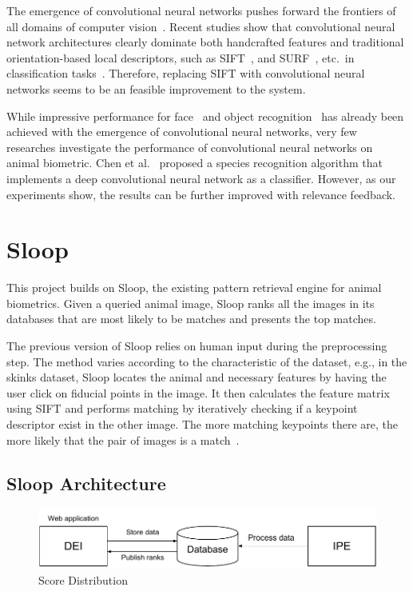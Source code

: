 The emergence of convolutional neural networks pushes forward the frontiers of
all domains of computer vision~\cite{lecun95}. Recent studies show that
convolutional neural network architectures clearly dominate both handcrafted
features and traditional orientation-based local descriptors, such as
SIFT~\cite{lowe04}, and SURF~\cite{surf08}, etc.\ in classification
tasks~\cite{fisher14,kriz12,prelu15,ILSVRC15}. Therefore, replacing SIFT with
convolutional neural networks seems to be an feasible improvement to the system.

While impressive performance for face~\cite{facerec97,deepface14} and object
recognition~\cite{kriz12,ILSVRC15} has already been achieved with the emergence
of convolutional neural networks, very few researches investigate the
performance of convolutional neural networks on animal biometric. Chen et
al.~\cite{animal14} proposed a species recognition algorithm that implements a
deep convolutional neural network as a classifier. However, as our experiments
show, the results can be further improved with relevance feedback.

\section{Sloop} %
\label{sec:sloop}

This project builds on Sloop, the existing pattern retrieval engine for animal
biometrics. Given a queried animal image, Sloop ranks all the images in its
databases that are most likely to be matches and presents the top matches.

The previous version of Sloop relies on human input during the preprocessing
step. The method varies according to the characteristic of the dataset, e.g., in
the skinks dataset, Sloop locates the animal and necessary features by having
the user click on fiducial points in the image. It then calculates the feature
matrix using SIFT and performs matching by iteratively checking if a keypoint
descriptor exist in the other image.  The more matching keypoints there are, the
more likely that the pair of images is a match~\cite{sloop15,sloop14,sloop13}.

\subsection{Sloop Architecture}

\begin{figure}[htb]
\centering
\includegraphics[width=\textwidth]{sloop/system}
\caption{Score Distribution}
\label{fig:sloop_overview} %
\end{figure}

